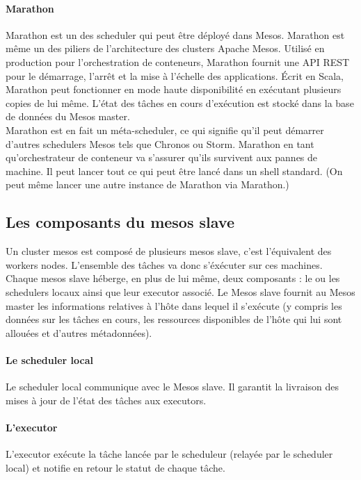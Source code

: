 \documentclass[11pt,fleqn]{book} %
\begin{document}
\paragraph{Marathon}
Marathon est un des scheduler qui peut être déployé dans Mesos. Marathon est même un des piliers de l'architecture des clusters Apache Mesos. Utilisé en production pour l'orchestration de conteneurs, Marathon fournit une API REST pour le démarrage, l'arrêt et la mise à l'échelle des applications. Écrit en Scala, Marathon peut fonctionner en mode haute disponibilité en exécutant plusieurs copies de lui même. L'état des tâches en cours d'exécution est stocké dans la base de données du Mesos master.\\

Marathon est en fait un méta-scheduler, ce qui signifie qu'il peut démarrer d'autres schedulers Mesos tels que Chronos ou Storm. Marathon en tant qu'orchestrateur de conteneur va s'assurer qu'ils survivent aux pannes de machine. Il peut lancer tout ce qui peut être lancé dans un shell standard. (On peut même lancer une autre instance de Marathon via Marathon.)

\subsection{Les composants du mesos slave}
Un cluster mesos est composé de plusieurs mesos slave, c'est l'équivalent des workers nodes. L'ensemble des tâches va donc s'éxécuter sur ces machines. Chaque mesos slave héberge, en plus de lui même, deux composants : le ou les schedulers locaux ainsi que leur executor associé. Le Mesos slave fournit au Mesos master les informations relatives à l'hôte dans lequel il s'exécute (y compris les données sur les tâches en cours, les ressources disponibles de l'hôte qui lui sont allouées et d'autres métadonnées).

\paragraph{Le scheduler local}
Le scheduler local communique avec le Mesos slave. Il garantit la livraison des mises à jour de l'état des tâches aux executors.
\paragraph{L'executor}
L'executor exécute la tâche lancée par le scheduleur (relayée par le scheduler local) et notifie en retour le statut de chaque tâche.
\end{document}
